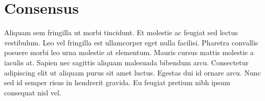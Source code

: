 \section{Consensus}
\label{sec:consensus}

Aliquam sem fringilla ut morbi tincidunt. Et molestie ac feugiat sed lectus vestibulum. Leo vel fringilla est ullamcorper eget nulla facilisi. Pharetra convallis posuere morbi leo urna molestie at elementum. Mauris cursus mattis molestie a iaculis at. Sapien nec sagittis aliquam malesuada bibendum arcu. Consectetur adipiscing elit ut aliquam purus sit amet luctus. Egestas dui id ornare arcu. Nunc sed id semper risus in hendrerit gravida. Eu feugiat pretium nibh ipsum consequat nisl vel.
